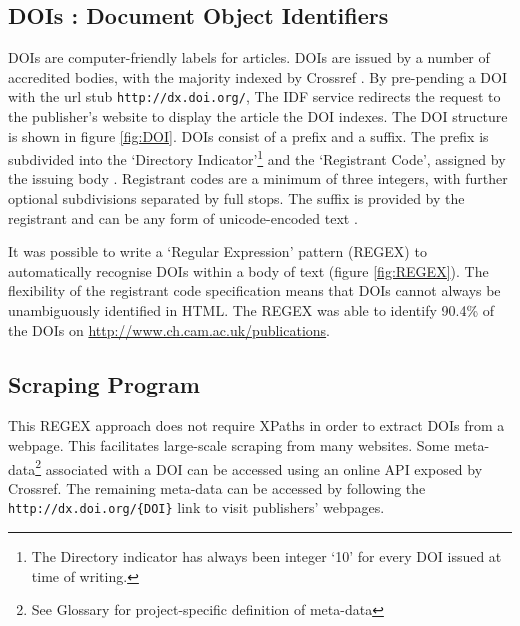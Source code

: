 \subsection{DOIs : Document Object Identifiers}
\label{sec:DOI}
DOIs are computer-friendly labels for articles. DOIs are issued by a number of accredited bodies, with the majority indexed by Crossref \cite{crossref-formation}. By pre-pending a DOI with the url stub \texttt{http://dx.doi.org/}, The IDF service redirects the request to the publisher's website to display the article the DOI indexes. The DOI structure is shown in figure \ref{fig:DOI}.
DOIs consist of a prefix and a suffix. The prefix is subdivided into the ‘Directory Indicator’\footnote{The Directory indicator has always been integer ‘10’ for every DOI issued at time of writing.} and the ‘Registrant Code’, assigned by the issuing body \cite{doi_handbook1}. Registrant codes are a minimum of three integers, with further optional subdivisions separated by full stops. The suffix is provided by the registrant and can be any form of unicode-encoded text \cite{doi_handbook1}.

It was possible to write a `Regular Expression' pattern (REGEX) to automatically recognise DOIs within a body of text (figure \ref{fig:REGEX}). The flexibility of the registrant code specification means that DOIs cannot always be unambiguously identified in HTML. 
The REGEX was able to identify 90.4\% of the DOIs on \url{http://www.ch.cam.ac.uk/publications}. 
\subsection{Scraping Program}
\label{sec:SCRAPING_PROGRAM}
This REGEX approach does not require XPaths in order to extract DOIs from a webpage. This facilitates large-scale scraping from many websites. Some meta-data\footnote{See Glossary for project-specific definition of meta-data} associated with a DOI can be accessed using an online API exposed by Crossref. The remaining meta-data can be accessed by following the \texttt{http://dx.doi.org/\{DOI\}} link to visit publishers' webpages.


